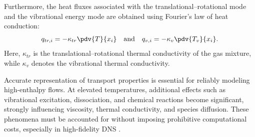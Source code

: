 Furthermore, the heat fluxes associated with the translational--rotational mode and the vibrational energy mode are obtained using Fourier's law of heat conduction:
\begin{equation}
    q_{tr,i} = - \kappa_{tr} \pdv{T}{x_i}
    \quad \text{and} \quad
    q_{v,i} = - \kappa_{v} \pdv{T_v}{x_i}.
\end{equation}
Here, $\kappa_{tr}$ is the translational--rotational thermal conductivity of the gas mixture, while $\kappa_{v}$ denotes the vibrational thermal conductivity.

Accurate representation of transport properties is essential for reliably modeling high-enthalpy flows. At elevated temperatures, additional effects such as vibrational excitation, dissociation, and chemical reactions become significant, strongly influencing viscosity, thermal conductivity, and species diffusion. These phenomena must be accounted for without imposing prohibitive computational costs, especially in high-fidelity \gls{DNS} \citep{Vincenti1965, Gnoffo1989}.







